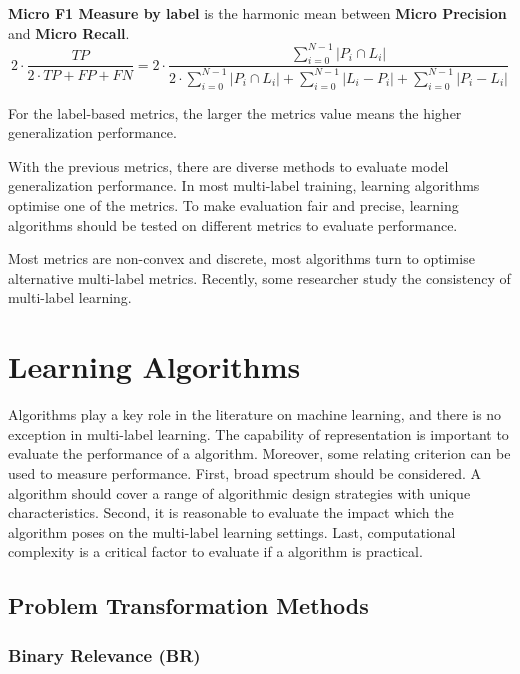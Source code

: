 \textbf{Micro F1 Measure by label} is the harmonic mean between \textbf{Micro Precision} and \textbf{Micro Recall}. 
\begin{equation}\label{eq:LabelMicroAccuracy}
2 \cdot \frac{TP}{2 \cdot TP + FP + FN}=2 \cdot \frac{\sum_{i=0}^{N-1} \left|P_i \cap L_i\right|}{2 \cdot
        \sum_{i=0}^{N-1} \left|P_i \cap L_i\right| + \sum_{i=0}^{N-1} \left|L_i - P_i\right| + \sum_{i=0}^{N-1}
        \left|P_i - L_i\right|}
\end{equation}

For the label-based metrics, the larger the metrics value means the higher generalization performance.

With the previous metrics, there are diverse methods to evaluate model generalization performance. In most multi-label training, learning algorithms optimise one of the metrics. To make evaluation fair and precise, learning algorithms should be tested on different metrics to evaluate performance.

Most metrics are non-convex and discrete, most algorithms turn to optimise alternative multi-label metrics. Recently, some researcher study the consistency of multi-label learning\citep{gao2013consistency}. 

\section{Learning Algorithms}

Algorithms play a key role in the literature on machine learning, and there is no exception in multi-label learning. The capability of representation is important to evaluate the performance of a algorithm. Moreover, some relating criterion can be used to measure performance. First, broad spectrum should be considered. A algorithm should cover a range of algorithmic design strategies with unique characteristics. Second, it is reasonable to evaluate the impact which the algorithm poses on the multi-label learning settings. Last, computational complexity is a critical factor to evaluate if a algorithm is practical.

\subsection{Problem Transformation Methods}

\subsubsection{Binary Relevance (BR)}

